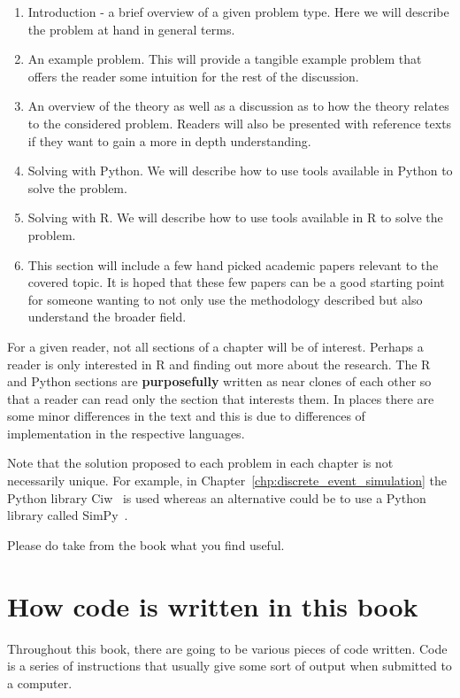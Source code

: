 \begin{enumerate}
\item
  Introduction - a brief overview of a given problem type. Here we will
  describe the problem at hand in general terms.
\item
  An example problem. This will provide a tangible example problem that
  offers the reader some intuition for the rest of the discussion.
\item
  An overview of the theory as well as a discussion as to how the theory relates
  to the considered problem. Readers will also be presented with reference
  texts if they want to gain a more in depth understanding.
\item
  Solving with Python. We will describe how to use tools available
  in Python to solve the problem.
\item
  Solving with R. We will describe how to use tools available
  in R to solve the problem.
\item
  This section will include a few hand picked academic papers relevant to the
  covered topic. It is hoped that these few papers can be a good starting point
  for someone wanting to not only use the methodology described but also
  understand the broader field.
\end{enumerate}

For a given reader, not all sections of a chapter will be of interest.
Perhaps a reader is only interested in R and finding out more about the
research.
The R and Python sections are \textbf{purposefully} written as near clones of
each other so that a reader can read only the section that interests them.
In places there are some minor differences in the text and this is due to
differences of implementation in the respective languages.

Note that the solution proposed to each problem in each chapter is not
necessarily unique. For example, in Chapter~\ref{chp:discrete_event_simulation}
the Python library Ciw~\cite{ciwpython, palmer2019ciw}
is used whereas an alternative could be to use a Python
library called SimPy~\cite{simpy}.

Please do take from the book what you find useful.

\section{How code is written in this book}\label{sec:how-code-is-written-in-this-book}

Throughout this book, there are going to be various pieces of code written. Code
is a series of instructions that usually give some sort of output when submitted
to a computer.

